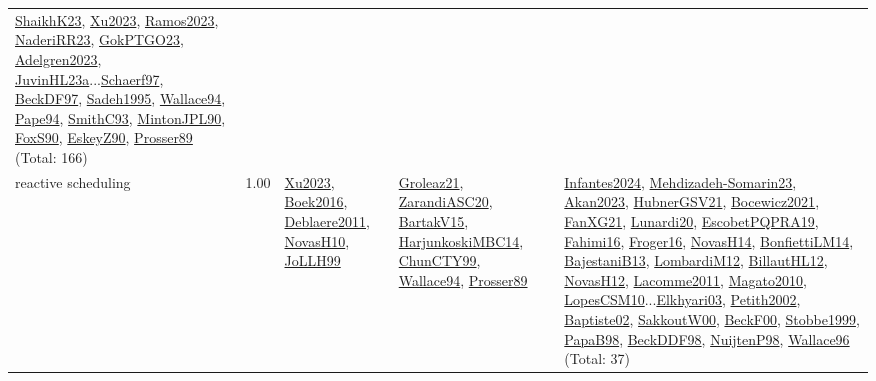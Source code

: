 {\begin{longtable}{p{3cm}r>{\raggedright\arraybackslash}p{6cm}>{\raggedright\arraybackslash}p{6cm}>{\raggedright\arraybackslash}p{8cm}}
\hyperref[detail:ShaikhK23]{ShaikhK23}, \hyperref[detail:Xu2023]{Xu2023}, \hyperref[detail:Ramos2023]{Ramos2023}, \hyperref[detail:NaderiRR23]{NaderiRR23}, \hyperref[detail:GokPTGO23]{GokPTGO23}, \hyperref[detail:Adelgren2023]{Adelgren2023}, \hyperref[detail:JuvinHL23a]{JuvinHL23a}...\hyperref[detail:Schaerf97]{Schaerf97}, \hyperref[detail:BeckDF97]{BeckDF97}, \hyperref[detail:Sadeh1995]{Sadeh1995}, \hyperref[detail:Wallace94]{Wallace94}, \hyperref[detail:Pape94]{Pape94}, \hyperref[detail:SmithC93]{SmithC93}, \hyperref[detail:MintonJPL90]{MintonJPL90}, \hyperref[detail:FoxS90]{FoxS90}, \hyperref[detail:EskeyZ90]{EskeyZ90}, \hyperref[detail:Prosser89]{Prosser89} (Total: 166)\\
\index{reactive scheduling}\index{Concepts!reactive scheduling}reactive scheduling &  1.00 & \hyperref[detail:Xu2023]{Xu2023}, \hyperref[detail:Boek2016]{Boek2016}, \hyperref[detail:Deblaere2011]{Deblaere2011}, \hyperref[detail:NovasH10]{NovasH10}, \hyperref[detail:JoLLH99]{JoLLH99} & \hyperref[detail:Groleaz21]{Groleaz21}, \hyperref[detail:ZarandiASC20]{ZarandiASC20}, \hyperref[detail:BartakV15]{BartakV15}, \hyperref[detail:HarjunkoskiMBC14]{HarjunkoskiMBC14}, \hyperref[detail:ChunCTY99]{ChunCTY99}, \hyperref[detail:Wallace94]{Wallace94}, \hyperref[detail:Prosser89]{Prosser89} & \hyperref[detail:Infantes2024]{Infantes2024}, \hyperref[detail:Mehdizadeh-Somarin23]{Mehdizadeh-Somarin23}, \hyperref[detail:Akan2023]{Akan2023}, \hyperref[detail:HubnerGSV21]{HubnerGSV21}, \hyperref[detail:Bocewicz2021]{Bocewicz2021}, \hyperref[detail:FanXG21]{FanXG21}, \hyperref[detail:Lunardi20]{Lunardi20}, \hyperref[detail:EscobetPQPRA19]{EscobetPQPRA19}, \hyperref[detail:Fahimi16]{Fahimi16}, \hyperref[detail:Froger16]{Froger16}, \hyperref[detail:NovasH14]{NovasH14}, \hyperref[detail:BonfiettiLM14]{BonfiettiLM14}, \hyperref[detail:BajestaniB13]{BajestaniB13}, \hyperref[detail:LombardiM12]{LombardiM12}, \hyperref[detail:BillautHL12]{BillautHL12}, \hyperref[detail:NovasH12]{NovasH12}, \hyperref[detail:Lacomme2011]{Lacomme2011}, \hyperref[detail:Magato2010]{Magato2010}, \hyperref[detail:LopesCSM10]{LopesCSM10}...\hyperref[detail:Elkhyari03]{Elkhyari03}, \hyperref[detail:Petith2002]{Petith2002}, \hyperref[detail:Baptiste02]{Baptiste02}, \hyperref[detail:SakkoutW00]{SakkoutW00}, \hyperref[detail:BeckF00]{BeckF00}, \hyperref[detail:Stobbe1999]{Stobbe1999}, \hyperref[detail:PapaB98]{PapaB98}, \hyperref[detail:BeckDDF98]{BeckDDF98}, \hyperref[detail:NuijtenP98]{NuijtenP98}, \hyperref[detail:Wallace96]{Wallace96} (Total: 37)\\

\end{longtable}}
